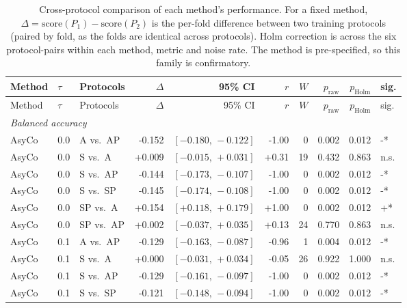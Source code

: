 
\begin{landscape}
\begin{scriptsize}
\setlength{\tabcolsep}{3pt}
\setlength{\LTcapwidth}{\linewidth}
\begin{longtable}{lllrrrrrrl}
\caption{Cross-protocol comparison of each method's performance. For a fixed method, $\Delta=\text{score}(P_1)-\text{score}(P_2)$ is the per-fold difference between two training protocols (paired by fold, as the folds are identical across protocols). Holm correction is across the six protocol-pairs within each method, metric and noise rate. The method is pre-specified, so this family is confirmatory.}\label{tab:app-protocol-comparison-full}\\
\toprule
Method & $\tau$ & Protocols & $\Delta$ & 95\% CI & $r$ & $W$ & $p_{\mathrm{raw}}$ & $p_{\mathrm{Holm}}$ & sig. \\
\midrule
\endfirsthead
\toprule
Method & $\tau$ & Protocols & $\Delta$ & 95\% CI & $r$ & $W$ & $p_{\mathrm{raw}}$ & $p_{\mathrm{Holm}}$ & sig. \\
\midrule
\endhead
\multicolumn{10}{l}{\textit{Balanced accuracy}} \\
AsyCo & 0.0 & A vs.\ AP & -0.152 & $[-0.180,\,-0.122]$ & -1.00 & 0 & 0.002 & 0.012 & -* \\
AsyCo & 0.0 & S vs.\ A & +0.009 & $[-0.015,\,+0.031]$ & +0.31 & 19 & 0.432 & 0.863 & n.s. \\
AsyCo & 0.0 & S vs.\ AP & -0.144 & $[-0.173,\,-0.107]$ & -1.00 & 0 & 0.002 & 0.012 & -* \\
AsyCo & 0.0 & S vs.\ SP & -0.145 & $[-0.174,\,-0.108]$ & -1.00 & 0 & 0.002 & 0.012 & -* \\
AsyCo & 0.0 & SP vs.\ A & +0.154 & $[+0.118,\,+0.179]$ & +1.00 & 0 & 0.002 & 0.012 & +* \\
AsyCo & 0.0 & SP vs.\ AP & +0.002 & $[-0.037,\,+0.035]$ & +0.13 & 24 & 0.770 & 0.863 & n.s. \\
AsyCo & 0.1 & A vs.\ AP & -0.129 & $[-0.163,\,-0.087]$ & -0.96 & 1 & 0.004 & 0.012 & -* \\
AsyCo & 0.1 & S vs.\ A & +0.000 & $[-0.031,\,+0.034]$ & -0.05 & 26 & 0.922 & 1.000 & n.s. \\
AsyCo & 0.1 & S vs.\ AP & -0.129 & $[-0.161,\,-0.097]$ & -1.00 & 0 & 0.002 & 0.012 & -* \\
AsyCo & 0.1 & S vs.\ SP & -0.121 & $[-0.148,\,-0.094]$ & -1.00 & 0 & 0.002 & 0.012 & -* \\

\end{longtable}
\end{scriptsize}
\end{landscape}
